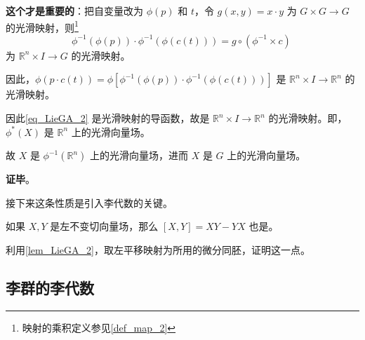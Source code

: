 \textbf{这个才是重要的}：把自变量改为 $\phi(p)$ 和 $t$，令 $g(x, y)=x\cdot y$ 为 $G\times G\to G$ 的光滑映射，则\footnote{映射的乘积定义参见\autoref{def_map_2} }
\begin{equation}
\phi^{-1}(\phi(p))\cdot \phi^{-1}(\phi(c(t)))=g\circ(\phi^{-1}\times c)~
\end{equation}
为 $\mathbb{R}^n\times I\to G$ 的光滑映射。

因此，$\phi(p\cdot c(t))=\phi[\phi^{-1}(\phi(p))\cdot \phi^{-1}(\phi(c(t)))]$ 是 $\mathbb{R}^n\times I\to \mathbb{R}^n$ 的光滑映射。

因此\autoref{eq_LieGA_2} 是光滑映射的导函数，故是 $\mathbb{R}^n\times I\to \mathbb{R}^n$ 的光滑映射。即，$\phi^*(X)$ 是 $\mathbb{R}^n$ 上的光滑向量场。

故 $X$ 是 $\phi^{-1}(\mathbb{R}^n)$ 上的光滑向量场，进而 $X$ 是 $G$ 上的光滑向量场。









\textbf{证毕}。

接下来这条性质是引入李代数的关键。

\begin{exercise}{}
如果 $X, Y$ 是左不变切向量场，那么 $[X, Y]=XY-YX$ 也是。

利用\autoref{lem_LieGA_2}，取左平移映射为所用的微分同胚，证明这一点。
\end{exercise}


\subsection{李群的李代数}

